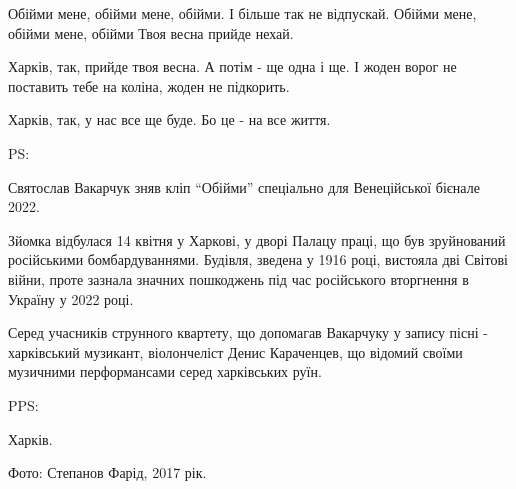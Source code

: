 \obeycr
\noindent
Обійми мене, обійми мене, обійми. 
І більше так не відпускай.
Обійми мене, обійми мене, обійми
Твоя весна прийде нехай.
\restorecr

Харків, так, прийде твоя весна. А потім - ще одна і ще. І жоден ворог не
поставить тебе на коліна, жоден не підкорить. 


Харків, так, у нас все ще буде. Бо це - на все життя. 

PS:

Святослав Вакарчук зняв кліп \enquote{Обійми} спеціально для Венеційської бієнале 2022.

Зйомка відбулася 14 квітня у Харкові, у дворі Палацу праці, що був зруйнований
російськими бомбардуваннями. Будівля, зведена у 1916 році, вистояла дві Світові
війни, проте зазнала значних пошкоджень під час російського вторгнення в
Україну у 2022 році.

Серед учасників струнного квартету, що допомагав Вакарчуку у запису пісні -
харківський музикант, віолончеліст Денис Караченцев, що відомий своїми
музичними перформансами серед харківських руїн. 

PPS:

Харків. 

Фото: Степанов Фарід, 2017 рік.


